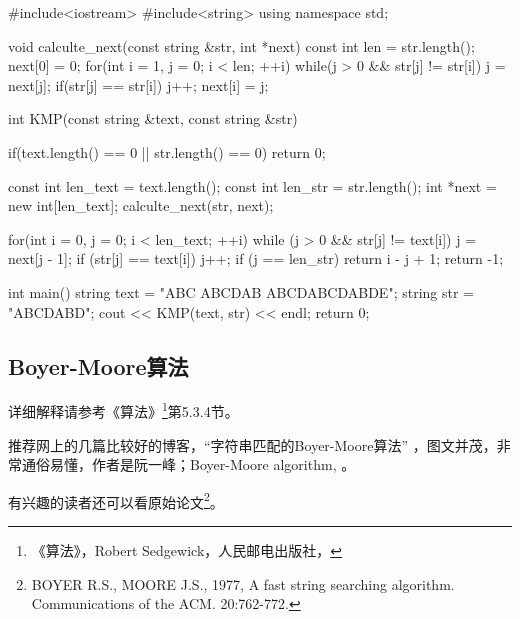 \begin{NoteCode}
#include<iostream>
#include<string>
using namespace std;

void calculte_next(const string &str, int *next){
    const int len = str.length();
    next[0] = 0;
    for(int i = 1, j = 0; i < len; ++i){
        while(j > 0 && str[j] != str[i]) j = next[j];
        if(str[j] == str[i]) j++;
        next[i] = j;
    }
}

int KMP(const string &text, const string &str){
    if(text.length() == 0 || str.length() == 0) return 0;

    const int len_text = text.length();
    const int len_str = str.length();
    int *next = new int[len_text];
    calculte_next(str, next);

    for(int i = 0, j = 0; i < len_text; ++i){
        while (j > 0 && str[j] != text[i]) j = next[j - 1];
        if (str[j] == text[i]) j++;
        if (j == len_str) return i - j + 1;
    }
    return -1;
}

int main(){
    string text = "ABC ABCDAB ABCDABCDABDE";
    string str = "ABCDABD";
    cout << KMP(text, str) << endl;
    return 0;
}
\end{NoteCode}


\subsection{Boyer-Moore算法}
详细解释请参考《算法》\footnote{《算法》，Robert Sedgewick，人民邮电出版社，}第5.3.4节。

推荐网上的几篇比较好的博客，“字符串匹配的Boyer-Moore算法” ，图文并茂，非常通俗易懂，作者是阮一峰；Boyer-Moore algorithm, 。

有兴趣的读者还可以看原始论文\footnote{BOYER R.S., MOORE J.S., 1977, A fast string searching algorithm. Communications of the ACM. 20:762-772.}。

